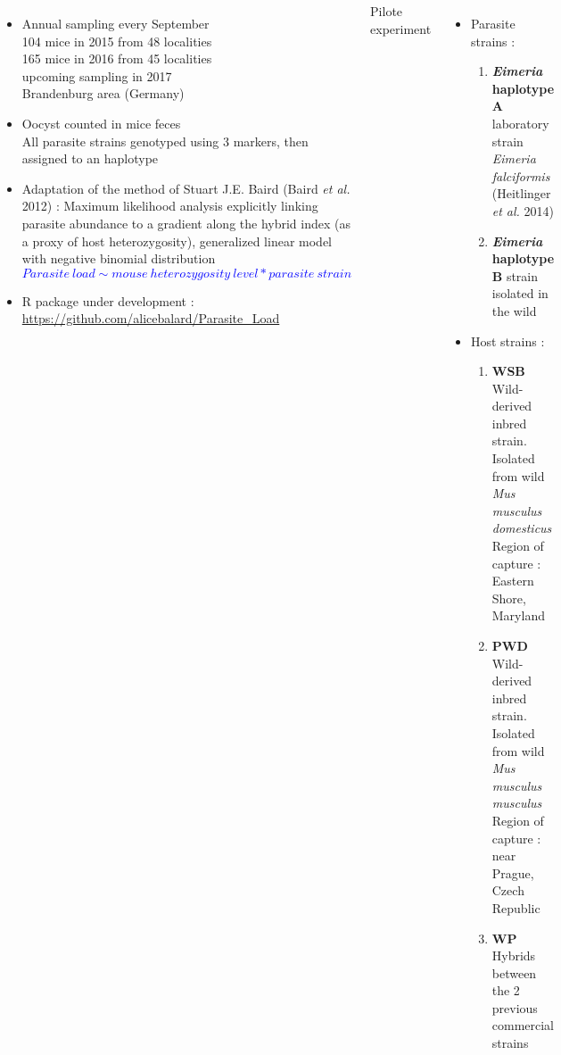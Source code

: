 \documentclass[30pt, a0paper, portrait, margin=0mm, innermargin=15mm,
               blockverticalspace=15mm, colspace=15mm, subcolspace=8mm]{tikzposter}
\begin{document}
\begin{columns}
{     \begin{itemize}

       \item{Annual sampling every September\\ 104 mice in 2015 from 48 localities\\ 165 mice in 2016 from 45 localities \\ upcoming sampling in 2017 \\ Brandenburg area (Germany)}
       \item{Oocyst counted in mice feces\\ All parasite strains genotyped using 3 markers, then assigned to an haplotype}
     
      \item Adaptation of the method of Stuart J.E. Baird (Baird \textit{et al.} 2012) : Maximum likelihood analysis explicitly linking parasite abundance to a gradient along the hybrid index (as a proxy of host heterozygosity), generalized linear model with negative binomial distribution \vspace{+1ex}
      \textcolor{blue}{\[Parasite\ load \sim mouse\ heterozygosity\ level * parasite\ strain  \]}\vspace{-2ex}%
      \item R package under development : \url{https://github.com/alicebalard/Parasite_Load}
      \end{itemize}
      }


      {Pilote experiment
      \begin{itemize}
      
      \item Parasite strains :
      
      \begin{enumerate}
      \item \textbf{\textit{Eimeria} haplotype A} laboratory strain \textit{Eimeria falciformis} (Heitlinger \textit{et al.} 2014)
      \item \textbf{\textit{Eimeria} haplotype B} strain isolated in the wild 
      \end{enumerate}
      
      \item Host strains :
      
      \begin{enumerate}
      \item \textbf{WSB} Wild-derived inbred strain. Isolated from wild \textit{Mus musculus domesticus}\\ Region of capture : Eastern Shore, Maryland
      \item \textbf{PWD} Wild-derived inbred strain. Isolated from wild \textit{Mus musculus musculus}\\ Region of capture : near Prague, Czech Republic
      \item \textbf{WP} Hybrids between the 2 previous commercial strains
      \end{enumerate}
      

\end{itemize}}
\end{columns}
\end{document}
